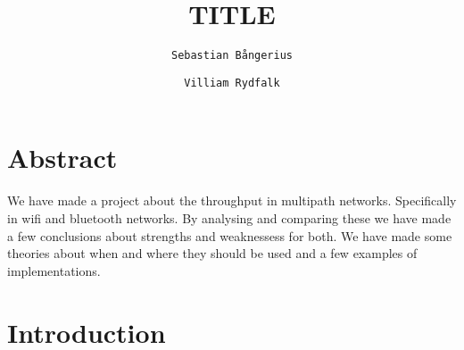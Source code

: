 \documentclass[10pt,a4paper]{article}
\author{
  \texttt{Sebastian Bångerius}
  \and
  \texttt{Villiam Rydfalk}
}
\begin{document}

\title{TITLE}
\maketitle

\cleardoublepage


\section{Abstract}

We have made a project about the throughput in multipath networks. Specifically in wifi and bluetooth networks. By analysing and comparing these we have made a few conclusions about strengths and weaknessess for both. We have made some theories about when and where they should be used and a few examples of implementations.

\section{Introduction}
\end{document}
